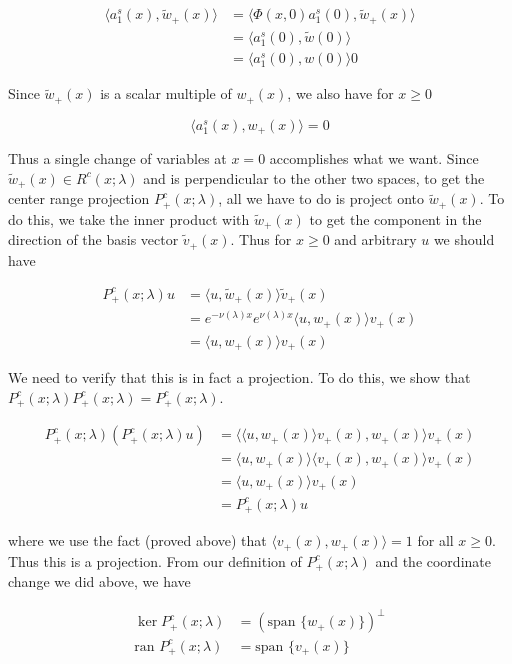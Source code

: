 \documentclass[12pt]{article}
\begin{document}
\begin{align*}
\langle a^s_1(x), \tilde{w}_+(x) \rangle &= \langle \Phi(x,0) a^s_1(0), \tilde{w}_+(x) \rangle \\
&= \langle a^s_1(0), \tilde{w}(0) \rangle \\
&= \langle a^s_1(0), w(0) \rangle 0
\end{align*}

Since $\tilde{w}_+(x)$ is a scalar multiple of $w_+(x)$, we also have for $x \geq 0$

\[
\langle a^s_1(x), w_+(x) \rangle = 0
\]

Thus a single change of variables at $x = 0$ accomplishes what we want. Since $\tilde{w}_+(x) \in R^c(x; \lambda)$ and is perpendicular to the other two spaces, to get the center range projection $P^c_+(x; \lambda)$, all we have to do is project onto $\tilde{w}_+(x)$. To do this, we take the inner product with $\tilde{w}_+(x)$ to get the component in the direction of the basis vector $\tilde{v}_+(x)$. Thus for $x \geq 0$ and arbitrary $u$ we should have

\begin{align*}
P^c_+(x; \lambda)u &= \langle u, \tilde{w}_+(x) \rangle \tilde{v}_+(x) \\
&= e^{-\nu(\lambda)x} e^{\nu(\lambda) x }\langle u, w_+(x) \rangle v_+(x) \\
&= \langle u, w_+(x) \rangle v_+(x)
\end{align*}

We need to verify that this is in fact a projection. To do this, we show that $P^c_+(x; \lambda)P^c_+(x; \lambda) = P^c_+(x; \lambda)$.

\begin{align*}
P^c_+(x; \lambda)( P^c_+(x; \lambda) u ) &= \langle \langle u, w_+(x) \rangle v_+(x), w_+(x) \rangle v_+(x) \\
&= \langle u, w_+(x) \rangle \langle v_+(x), w_+(x) \rangle v_+(x) \\
&= \langle u, w_+(x) \rangle v_+(x) \\
&= P^c_+(x; \lambda) u 
\end{align*}

where we use the fact (proved above) that $\langle v_+(x), w_+(x) \rangle = 1$ for all $x \geq 0$. Thus this is a projection. From our definition of $P^c_+(x; \lambda)$ and the coordinate change we did above, we have

\begin{align*}
\ker P^c_+(x; \lambda) &= ( \text{span }\{ w_+(x) \})^\perp\\
\text{ran } P^c_+(x; \lambda) &= \text{span }\{ v_+(x) \}
\end{align*}
\end{document}
